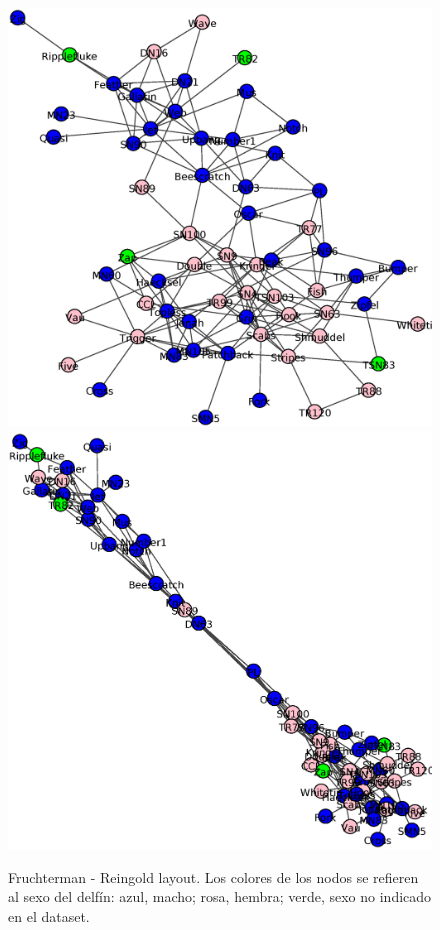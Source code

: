 \begin{figure}[h]
\centering
\includegraphics[scale = 0.25]{figuras/KamKaw}
\includegraphics[scale = 0.25]{figuras/Drl}
\label{fig:Layout_alternativos}
\caption{Fruchterman - Reingold layout. Los colores de los nodos se refieren al sexo del delfín: azul, macho; rosa, hembra; verde, sexo no indicado en el dataset.}
\end{figure}

